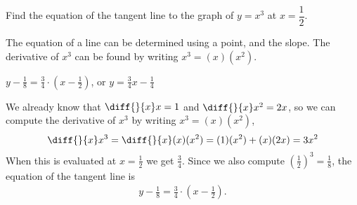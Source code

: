 \begin{Mquestion}[2015Q]\label{derivxcube}
Find the equation of the tangent line to the graph of $y=x^3$ at
$x=\dfrac{1}{2}$.
\end{Mquestion}
\begin{hint} The equation of a line can be determined using a point, and the slope. The derivative of $x^3$ can be found by writing $x^3=(x)(x^2)$.
\end{hint}
\begin{answer} $y -  \frac{1}{8} = \frac{3}{4}\cdot \left(x-\frac{1}{2}\right)$, or $y= \tfrac{3}{4} x - \tfrac{1}{4}$
\end{answer}
\begin{solution} 
We already know that $\diff{}{x}x=1$ and $\diff{}{x}x^2=2x$, so we can
compute the derivative of $x^3$ by writing $x^3=(x)(x^2)$,
\begin{equation*}
\diff{}{x} x^3 =\diff{}{x} (x)(x^2) = (1)(x^2)+(x)(2x)=3x^2
\end{equation*}
When this is evaluated at $x=\frac{1}{2}$ we get $\frac{3}{4}$. Since we 
also compute $\left( \frac{1}{2}\right)^3=\frac{1}{8}$, the equation of the tangent line is
\begin{align*}
y -  \frac{1}{8} = \frac{3}{4}\cdot \left(x-\frac{1}{2}\right).
\end{align*}
\end{solution}


